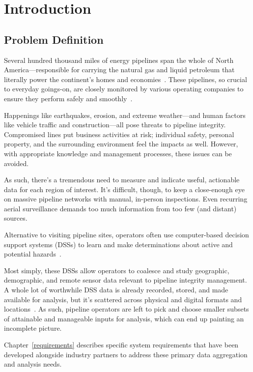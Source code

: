 \chapter{Introduction}
\label{intro}

\section{Problem Definition}
\label{Problem}
Several hundred thousand miles of energy pipelines span the whole of North America---responsible for carrying the natural gas and liquid petroleum that literally power the continent's homes and economies~\cite{PHMSA}. These pipelines, so crucial to everyday goings-on, are closely monitored by various operating companies to ensure they perform safely and smoothly~\cite{PHMSA2013}.

Happenings like earthquakes, erosion, and extreme weather---and human factors like vehicle traffic and construction---all pose threats to pipeline integrity. Compromised lines put business activities at risk; individual safety, personal property, and the surrounding environment feel the impacts as well. However, with appropriate knowledge and management processes, these issues can be avoided.

As such, there's a tremendous need to measure and indicate useful, actionable data for each region of interest. It's difficult, though, to keep a close-enough eye on massive pipeline networks with manual, in-person inspections. Even recurring aerial surveillance demands too much information from too few (and distant) sources.

Alternative to visiting pipeline sites, operators often use computer-based decision support systems (DSSs) to learn and make determinations about active and potential hazards~\cite{PHMSA2013,Dunning2013}. 

Most simply, these DSSs allow operators to coalesce and study geographic, demographic, and remote sensor data relevant to pipeline integrity management. A whole lot of worthwhile DSS data is already recorded, stored, and made available for analysis, but it's scattered across physical and digital formats and locations~\cite{Dunning2013}. As such, pipeline operators are left to pick and choose smaller subsets of attainable and manageable inputs for analysis, which can end up painting an incomplete picture.

Chapter~\ref{requirements} describes specific system requirements that have been developed alongside industry partners to address these primary data aggregation and analysis needs.

